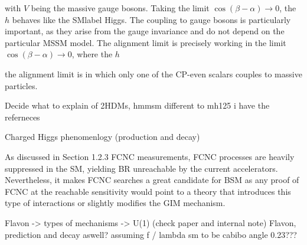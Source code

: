 %
%    

with $V$ being the massive gauge bosons. Taking the limit $\cos(\beta-\alpha)\to 0$, the $h$ behaves like the \acrshort{SMlabel} Higgs. The coupling to gauge bosons is particularly important, as they arise from the gauge invariance and do not depend on the particular MSSM model. 
The alignment limit is precisely working in the limit $\cos(\beta-\alpha)\to 0$, where the $h$

the alignment limit is in which only one of the CP-even scalars couples to massive particles. %





Decide what to explain of 2HDMs, hmmsm different to mh125 i have the referneces

Charged Higgs phenomenlogy (production and decay)

As discussed in Section 1.2.3 FCNC measurements, FCNC processes are heavily suppressed in the SM, yielding BR unreachable by the current accelerators. Nevertheless, it makes FCNC searches a great candidate for BSM as any proof of FCNC at the reachable sensitivity would point to a theory that introduces this type of interactions or slightly modifies the GIM mechanism.

Flavon -> types of mechanisms -> U(1) (check paper and internal note)
Flavon, prediction and decay aswell?
assuming f / lambda sm to be cabibo angle 0.23???


